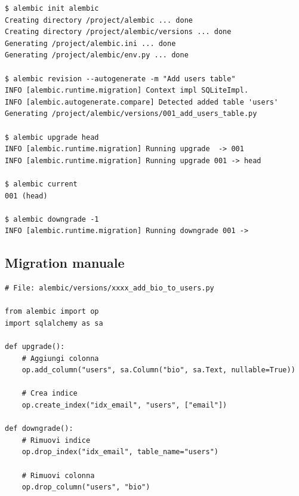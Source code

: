 \begin{tcolorbox}[colback=black!5, colframe=black!75, title=Comandi Alembic, fonttitle=\bfseries\ttfamily]
\begin{verbatim}
$ alembic init alembic
Creating directory /project/alembic ... done
Creating directory /project/alembic/versions ... done
Generating /project/alembic.ini ... done
Generating /project/alembic/env.py ... done

$ alembic revision --autogenerate -m "Add users table"
INFO [alembic.runtime.migration] Context impl SQLiteImpl.
INFO [alembic.autogenerate.compare] Detected added table 'users'
Generating /project/alembic/versions/001_add_users_table.py

$ alembic upgrade head
INFO [alembic.runtime.migration] Running upgrade  -> 001
INFO [alembic.runtime.migration] Running upgrade 001 -> head

$ alembic current
001 (head)

$ alembic downgrade -1
INFO [alembic.runtime.migration] Running downgrade 001 ->
\end{verbatim}
\end{tcolorbox}

\subsection{Migration manuale}

\begin{lstlisting}
# File: alembic/versions/xxxx_add_bio_to_users.py

from alembic import op
import sqlalchemy as sa

def upgrade():
    # Aggiungi colonna
    op.add_column("users", sa.Column("bio", sa.Text, nullable=True))

    # Crea indice
    op.create_index("idx_email", "users", ["email"])

def downgrade():
    # Rimuovi indice
    op.drop_index("idx_email", table_name="users")

    # Rimuovi colonna
    op.drop_column("users", "bio")
\end{lstlisting}

